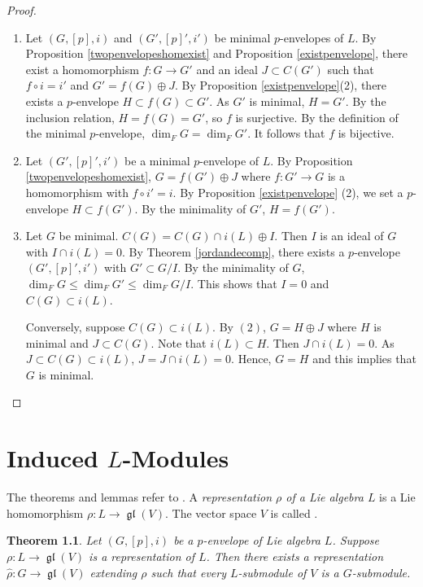 \documentclass[12pt,MSc]{muthesis_2023}
\theoremstyle{plain}%
\newtheorem{Theorem}[FactCounter]{Theorem} %
\theoremstyle{definition}
\theoremstyle{remark}
\DeclareMathOperator{\gl}{\mathfrak{gl}}
\begin{document}
\begin{proof}
\begin{enumerate}
\item[(1)]
Let $(G, [p], i)$ and $(G', [p]', i')$ be minimal $p$-envelopes of $L$. By Proposition \ref{twopenvelopeshomexist} and Proposition \ref{existpenvelope}, there exist a homomorphism $f:G \rightarrow G'$ and an ideal $J\subset C(G')$ such that $f\circ i=i'$ and $G'=f(G)\oplus J$. By Proposition \ref{existpenvelope}(2), there exists a $p$-envelope $H\subset f(G)\subset G'$. As $G'$ is minimal, $H=G'$. By the inclusion relation, $H=f(G)=G'$, so $f$ is surjective. By the definition of the minimal $p$-envelope, $\dim_FG=\dim_FG'$. It follows that $f$ is bijective.

\item[(2)]
Let $(G', [p]', i')$ be a minimal $p$-envelope of $L$. By Proposition \ref{twopenvelopeshomexist}, $G=f(G')\oplus J$ where $f:G' \rightarrow G$ is a homomorphism with $f\circ i'=i$. By Proposition \ref{existpenvelope} (2), we set a $p$-envelope $H\subset f(G')$. By the minimality of $G'$, $H=f(G')$.


\item[(3)]
Let $G$ be minimal. $C(G)=C(G)\cap i(L) \oplus I$. Then $I$ is an ideal of $G$ with $I\cap i(L)=0$. By Theorem \ref{jordandecomp}, there exists a $p$-envelope $(G', [p]', i')$ with $G' \subset G/I$. By the minimality of $G$, $\dim_F G \leq \dim_F G' \leq \dim_F G/I$. This shows that $I=0$ and $C(G)\subset i(L)$.

Conversely, suppose $C(G)\subset i(L)$. By $(2)$, $G=H \oplus J$ where $H$ is minimal and $J \subset C(G)$. Note that $i(L)\subset H$. Then $J \cap i(L)=0$. As $J \subset C(G) \subset i(L)$, $J=J \cap i(L)=0$. Hence, $G=H$ and this implies that $G$ is minimal.
\end{enumerate}
\end{proof}

\chapter{Induced $L$-Modules}

The theorems and lemmas refer to  \cite[Section 6, Chapter 5]{SF}. A \textit{representation $\rho$ of a Lie algebra $L$} is a Lie homomorphism $\rho:L \rightarrow \gl(V)$. The vector space $V$ is called .

\begin{Theorem}\label{existextendreplsubmoduleGsubmodule}
Let $(G, [p], i)$ be a $p$-envelope of Lie algebra $L$. Suppose $\rho:L \rightarrow \gl(V)$ is a representation of $L$. Then there exists a representation $\widehat{\rho}: G \rightarrow \gl(V)$ extending $\rho$ such that every $L$-submodule of $V$ is a $G$-submodule.
\end{Theorem}
\end{document}
